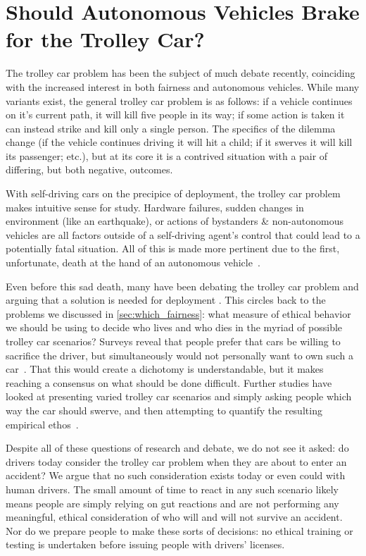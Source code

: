 \documentclass[11pt]{article}
\begin{document}
\section{Should Autonomous Vehicles Brake for the Trolley Car?} \label{sec:trolley}

The trolley car problem \cite{foot1967problem,thomson1976killing} has been the subject of much debate recently, coinciding with the increased interest in both fairness and autonomous vehicles. While many variants exist, the general trolley car problem is as follows:  if a vehicle continues on it's current path, it will kill five people in its way; if some action is taken it can instead strike and kill only a single person. The specifics of the dilemma change (if the vehicle continues driving it will hit a child; if it swerves it will kill its passenger; etc.), but at its core it is a contrived situation with a pair of differing, but both negative, outcomes.

With self-driving cars on the precipice of deployment, the trolley car problem makes intuitive sense for study. Hardware failures, sudden changes in environment (like an earthquake), or actions of bystanders \& non-autonomous vehicles are all factors outside of a self-driving agent's control that could lead to a potentially fatal situation. All of this is made more pertinent due to the first, unfortunate, death at the hand of an autonomous vehicle~\cite{Lee2018}. 

Even before this sad death, many have been debating the trolley car problem and arguing that a solution is needed for deployment \cite{Achenbach2015,Corfield2017,Lin2016,Goodall2016}. This circles back to the problems we discussed in \autoref{sec:which_fairness}: what measure of ethical behavior we should be using to decide who lives and who dies in the myriad of possible trolley car scenarios? Surveys reveal that people prefer that cars be willing to sacrifice the driver, but simultaneously would not personally want to own such a car~\cite{Bonnefon2016}. That this would create a dichotomy is understandable, but it makes reaching a consensus on what should be done difficult. Further studies have looked at presenting varied trolley car scenarios and simply asking people which way the car should swerve, and then attempting to quantify the resulting empirical ethos~\cite{Shariff2017}. 

Despite all of these questions of research and debate, we do not see it asked: do drivers today consider the trolley car problem when they are about to enter an accident? We argue that no such consideration exists today or even could with human drivers. The small amount of time to react in any such scenario likely means people are simply relying on gut reactions and are not performing any meaningful, ethical consideration of who will and will not survive an accident. Nor do we prepare people to make these sorts of decisions: no ethical training or testing is undertaken before issuing people with drivers' licenses.
\end{document}
